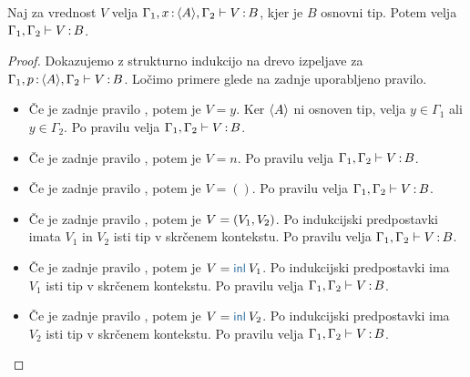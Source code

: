 \begin{lema}\label{lem:tovor-osnovni-tip-skrcitev}
	Naj za vrednost $V$ velja $\Gamma_1, x \mathinner{:} \langle A \rangle, \Gamma_2 \vdash V \mathinner{:} B$, kjer je $B$ osnovni tip. Potem velja $\Gamma_1, \Gamma_2 \vdash V \mathinner{:} B$.
\end{lema}

\begin{proof}
	Dokazujemo z strukturno indukcijo na drevo izpeljave za $\Gamma_1, p \mathinner{:} \langle A \rangle, \Gamma_2 \vdash V \mathinner{:} B$.
	Ločimo primere glede na zadnje uporabljeno pravilo.
	
	\begin{itemize}
		\item[\sitem] Če je zadnje pravilo , potem je $V = y$. Ker $\langle A \rangle$ ni osnoven tip, velja $y \in \Gamma_1$ ali $y \in \Gamma_2$.
		Po pravilu  velja $\Gamma_1, \Gamma_2 \vdash V \mathinner{:} B$.
		
		\item Če je zadnje pravilo , potem je $V = n$. Po pravilu  velja $\Gamma_1, \Gamma_2 \vdash V \mathinner{:} B$.
		
		\item Če je zadnje pravilo , potem je $V = ()$. Po pravilu  velja $\Gamma_1, \Gamma_2 \vdash V \mathinner{:} B$.
		
		\item Če je zadnje pravilo , potem je $V =( V_1 , V_2 )$.
		Po indukcijski predpostavki imata $V_1$ in $V_2$ isti tip v skrčenem kontekstu.
		Po pravilu  velja $\Gamma_1, \Gamma_2 \vdash V \mathinner{:} B$.
		
		
		\item Če je zadnje pravilo , potem je $V = \tminl{V_1}$.
		Po indukcijski predpostavki ima $V_1$ isti tip v skrčenem kontekstu.
		Po pravilu  velja $\Gamma_1, \Gamma_2 \vdash V \mathinner{:} B$.
		
		\item Če je zadnje pravilo , potem je $V = \tminl{V_2}$.
		Po indukcijski predpostavki ima $V_2$ isti tip v skrčenem kontekstu.
		Po pravilu  velja $\Gamma_1, \Gamma_2 \vdash V \mathinner{:} B$.
		

\end{itemize}
\end{proof}
